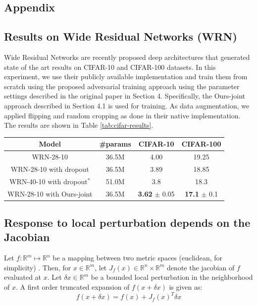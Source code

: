 \begin{center}
\section*{Appendix}
\end{center}
\subsection*{Results on Wide Residual Networks (WRN)}
Wide Residual Networks are recently proposed deep architectures that generated state of the art results on CIFAR-10 and CIFAR-100 datasets. In this experiment, we use their publicly available implementation and train them from scratch using the proposed adversarial training approach using the parameter settings described in the original paper in Section 4. Specifically, the Ours-joint approach described in Section 4.1 is used for training. As data augmentation, we applied flipping and random cropping as done in their native implementation. The results are shown in Table \ref{tab:cifar-results}. 
\begin{center}
\label{tab:cifar-results}
 \begin{tabular}{| c | c | c | c |} 
 \hline
 Model & \#params & CIFAR-10 & CIFAR-100 \\ [0.5ex] 
 \hline
 WRN-28-10  & 36.5M &  4.00 & 19.25\\ 
 \hline
 WRN-28-10 with dropout  & 36.5M &  3.89 & 18.85\\ 
 \hline
 WRN-40-10 with dropout$^{*}$  & 51.0M &  3.8 & 18.3\\ 
 \hline
 WRN-28-10 with Ours-joint & 36.5M & \textbf{3.62} $\pm$ 0.05 & \textbf{17.1} $\pm$ 0.1 \\
 \hline  
\end{tabular}
\end{center}

\subsection*{Response to local perturbation depends on the Jacobian}
Let $f:\mathbb{R}^m \mapsto \mathbb{R}^n$ be a mapping between two metric spaces (euclidean, for simplicity) . Then, for $x \in \mathbb{R}^m$, let $J_f(x) \in \mathbb{R}^n \times \mathbb{R}^m$ denote the jacobian of $f$ evaluated at $x$. Let $\delta x \in \mathbb{R}^m$ be a bounded local perturbation in the neighborhood of $x$. A first order truncated expansion of $f(x+\delta x)$ is given as: 
\begin{equation*}
f(x+\delta x)=f(x)+J_f(x)^T\delta x 
\end{equation*}

